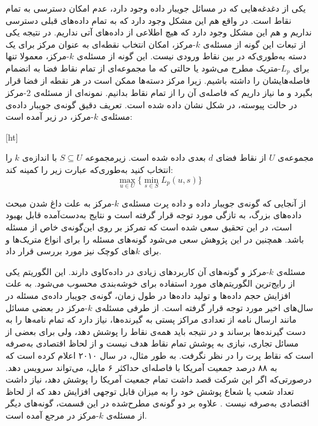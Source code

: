 یکی از دغدغه‌هایی که در مسائل جویبار داده وجود دارد، عدم امکان دسترسی به تمام نقاط است. در واقع هم این مشکل وجود دارد که به تمام داده‌های قبلی دسترسی نداریم و هم این مشکل وجود دارد که هیچ اطلاعی از داده‌های آتی نداریم. در نتیجه یکی از تبعات این گونه از‌ مسئله‌ی $k$-مرکز، امکان انتخاب نقطه‌ای به عنوان مرکز برای یک دسته به‌طوری‌که در بین نقاط ورودی نیست. این گونه از مسئله‌ی $k$-مرکز، معمولا تنها برای $L_p$-متریک مطرح می‌شود یا حالتی که ما مجموعه‌ای از تمام نقاط فضا به انضمام فاصله‌هایشان را داشته باشیم. زیرا مرکز دسته‌ها ممکن است در هر نقطه از فضا قرار بگیرد و ما نیاز داریم که فاصله‌ی آن را از تمام نقاط بدانیم. نمونه‌ای از مسئله‌ی $2$-مرکز در حالت پیوسته، در شکل‌  نشان داده شده است. تعریف دقیق گونه‌ی جویبار داده‌ی مسئله‌ی $k$‌-مرکز، در زیر آمده است:

[ht]

مجموعه‌ی $U$ از نقاط فضای $d$ بعدی داده شده است. زیرمجموعه $S \subseteq U$ با اندازه‌ی $k$ را انتخاب کنید به‌طوری‌که عبارت زیر را کمینه کند:
$$\max_{u \in U} \{ \min_{s \in S} L_p(u, s) \}$$

از آنجایی که گونه‌ی جویبار داده و داده پرت مسئله‌ی $k$-مرکز به علت داغ شدن مبحث داده‌های بزرگ، به تازگی مورد توجه قرار گرفته است و نتایج به‌دست‌آمده قابل بهبود است، در این تحقیق سعی شده است که تمرکز بر روی این‌گونه‌ی خاص از مسئله باشد. همچنین در این پژوهش سعی می‌شود گونه‌های مسئله را برای انواع متریک‌ها و برای $k$های کوچک نیز مورد بررسی قرار داد. 


مسئله‌ی $k$-مرکز و گونه‌های آن کاربردهای زیادی در داده‌کاوی دارند. این الگوریتم یکی از رایج‌ترین الگوریتم‌های مورد استفاده برای خوشه‌بندی محسوب می‌شود. به علت افزایش حجم داده‌ها و تولید  داده‌ها در طول زمان، گونه‌ی جویبار داده‌ی مسئله در سال‌های اخیر مورد توجه قرار گرفته است. از طرفی مسئله‌ی $k$-مرکز در بعضی مسائل مانند ارسال نامه از‌ تعدادی مراکز پستی به گیرنده‌ها، نیاز دارد که تمام نامه‌ها را به دست گیرنده‌ها برساند و در نتیجه باید همه‌ی نقاط را پوشش دهد، ولی برای بعضی از مسائل تجاری، نیازی به پوشش تمام نقاط هدف نیست و از لحاظ اقتصادی به‌صرفه است که نقاط پرت را در نظر نگرفت. به طور مثال،  در سال ۲۰۱۰ اعلام کرده است که به ۸۸ درصد جمعیت آمریکا با فاصله‌ای حداکثر ۶ مایل، می‌تواند سرویس دهد. درصورتی‌که اگر این شرکت قصد داشت تمام جمعیت آمریکا را پوشش دهد، نیاز داشت تعداد شعب یا شعاع پوشش خود را به میزان قابل توجهی افزایش دهد که از لحاظ اقتصادی به‌صرفه نیست . علاوه بر دو گونه‌ی مطرح‌شده در این قسمت، گونه‌های دیگر از مسئله‌ی $k$-مرکز در مرجع  آمده است.

